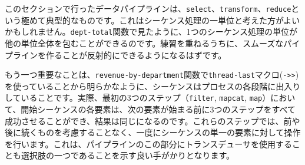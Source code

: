 このセクションで行ったデータパイプラインは、\texttt{select}、\texttt{transform}、\texttt{reduce}という極めて典型的なものです。これはシーケンス処理の一単位と考えた方がよいかもしれません。\texttt{dept-total}関数で見たように、1つのシーケンス処理の単位が他の単位全体を包むことができるのです。練習を重ねるうちに、スムーズなパイプラインを作ることが反射的にできるようになるはずです。

もう一つ重要なことは、\texttt{revenue-by-department}関数で\texttt{thread-last}マクロ(\texttt{->>})を使っていることから明らかなように、シーケンスはプロセスの各段階に出入りしていることです。実際、最初の3つのステップ（\texttt{filter}, \texttt{mapcat}, \texttt{map}）において、開始シーケンスの各要素は、次の要素が始まる前に3つのステップをすべて成功させることができ、結果は同じになるのです。これらのステップでは、前や後に続くものを考慮することなく、一度にシーケンスの単一の要素に対して操作を行います。これは、パイプラインのこの部分にトランスデューサを使用することも選択肢の一つであることを示す良い手がかりとなります。